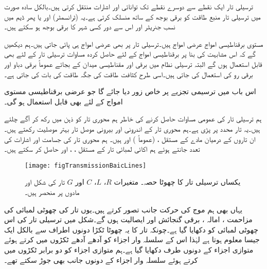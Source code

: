 ترسیلی تار ایک نقطے سے  دوسرے نقطے تک توانائی اور اشارات منتقل کرتی ہیں۔بالکل سادہ صورت میں ترسیلی تار منبع طاقت کو برقی بوجھ کے ساتھ منسلک کرتی ہے۔یہ  (ٹرانسمٹر)  اور  یا پھر ڈیم میں نسب جنریٹر اور اس سے دور کسی شہر کا برقی بوجھ ہو سکتے ہیں۔

مستوی برقناطیسی امواج عرضی امواج ہیں۔ترسیلی تار پر بھی عرضی امواج ہی پائی جاتی ہیں۔ہم دیکھیں گے کہ اس مشابہت کی بنا پر برقناطیسی امواج کے لئے حاصل کردہ مساوات ترسیلی تار کے لئے بھی قابل استعمال ہوں گے البتہ ترسیلی نظام میں برقی اور مقناطیسی میدان کے بجائے عموماً برقی دباو اور برقی رو کی استعمال کی جاتی ہیں۔اسی طرح کثافت طاقت کی جگہ طاقت کی بات کی جاتی ہے۔

اس باب میں ترسیمی تجزیے پر خاص زور  دیا جائے گا جو عرضی برقناطیسی مستوی امواج کے لئے بھی قابل استعمال ہو گی۔ 

ہم ترسیلی تار کی عمومی مساوات حاصل کرنے کی خاطر ہم محوری تار کو ذہن میں رکھ کر آگے چلتے ہیں۔یہ تار  محدد پر پڑی ہے۔ہم محوری تار کے اندرونی اور بیرونی موصل تار بہتر موصلیت  رکھتے ہیں۔ان تاروں کے درمیان  مادے کے مستقل ،  (عموماً ) اور  ہیں۔ 
ہم محوری تار کی جسامت اور اشارات کی تعدد جانتے ہوئے ہم اکائی لمبائی تار کے مستقل ، ،  اور  حاصل کر سکتے ہیں۔

\begin{figure}
\centering
\texttt{[image: figTransmissionBaicLines]}
\caption{یکساں ترسیلی تار کا چھوٹا حصہ۔ متغیرات $R$، $L$، $C$ اور $G$ تار کی شکل اور مادوں پر منحصر ہیں۔}
\label{شکل_ترسیل_سادہ_نظام}
\end{figure}

یہاں بھی ہم موج کی حرکت  جانب تصور کرتے ہیں۔یوں تار کی چھوٹی لمبائی  کی مزاحمت ، امالہ ، برقی گنجائش  اور ایصالیت  ہوں گے۔شکل  میں ترسیلی تار کی اس چھوٹی لمبائی کو دکھایا گیا ہے۔چونکہ تار کا یہ چھوٹا ٹکڑا دونوں اطراف سے بالکل ایک جیسا معلوم ہوتا ہے  لہٰذا اس کے سلسلہ وار اجزاء کو آدھے آدھے ٹکڑوں میں کرتے ہوئے متوازی اجزاء کے دونوں طرف دکھایا گیا ہے۔ہم متوازی اجزاء کو دو برابر ٹکڑوں میں کرتے ہوئے سلسلہ وار اجزاء کے دونوں جانب بھی جوڑ سکتے تھے۔

